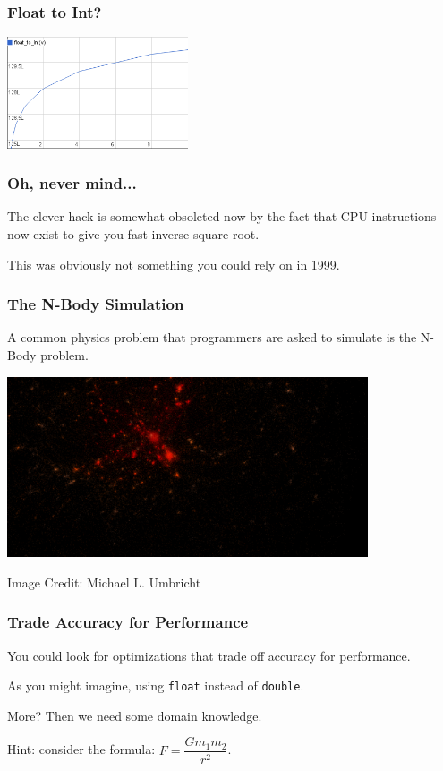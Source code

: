 \begin{frame}
\frametitle{Float to Int?}

\begin{center}
	\includegraphics[width=0.4\textwidth]{images/float-to-int.png}
\end{center}



\end{frame}



\begin{frame}
\frametitle{Oh, never mind...}


The clever hack is somewhat obsoleted now by the fact that CPU instructions now exist to give you fast inverse square root. 

This was obviously not something you could rely on in 1999.

\end{frame}




\begin{frame}
\frametitle{The N-Body Simulation}

A common physics problem that programmers are asked to simulate is the N-Body problem.

\begin{center}
\includegraphics[width=0.8\textwidth]{images/Galaxy_Cluster_sim.png}
\end{center}
\hfill Image Credit: Michael L. Umbricht 


\end{frame}


\begin{frame}
\frametitle{Trade Accuracy for Performance}

You could look for optimizations that trade off accuracy for performance. 

As you might imagine, using \texttt{float} instead of \texttt{double}.


More? Then we need some domain knowledge. 

Hint: consider the formula: $F = \dfrac{Gm_{1}m_{2}}{r^{2}}$. 

\end{frame}



